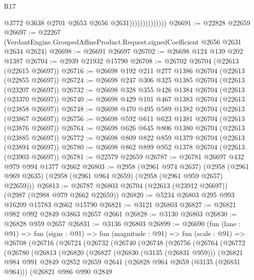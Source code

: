 \begin{lexlean}{R17}
\begin{coremodule}
                                @3772
                                @3638
                                @2701
                                @2653
                                @2656
                                @2631))))))))))))))
@26691 := @22828 @22659
@26697 := @22267
    (VerdantEngine.GroupedAffineProduct.Request.signedCoefficient @2656 @2631 @2634 @2624)
@26698 := @26691 @26697
@26702 := @26698 @124 @139 @202 @1387
@26704 := @2939 @21932 @15790
@26708 := @26702 @26704 (@22613 (@22615 @26697))
@26716 := @26698 @192 @211 @277 @1386 @26704 (@22613 (@22855 @26697))
@26724 := @26698 @247 @306 @325 @1385 @26704 (@22613 (@23207 @26697))
@26732 := @26698 @328 @355 @426 @1384 @26704 (@22613 (@23370 @26697))
@26740 := @26698 @429 @101 @467 @1383 @26704 (@22613 (@23858 @26697))
@26748 := @26698 @470 @495 @589 @1382 @26704 (@22613 (@23867 @26697))
@26756 := @26698 @592 @611 @623 @1381 @26704 (@22613 (@23876 @26697))
@26764 := @26698 @626 @645 @806 @1380 @26704 (@22613 (@23885 @26697))
@26772 := @26698 @809 @822 @859 @1379 @26704 (@22613 (@23894 @26697))
@26780 := @26698 @862 @899 @952 @1378 @26704 (@22613 (@23903 @26697))
@26781 := @22579 @22659
@26787 := @26781 @26697 @432 @979 @994 @1377 @2662
@26803 := @2958
    (@2961 @974 @2637)
    (@2958 (@2961 @969 @2635) (@2958 (@2961 @964 @2659) (@2958 (@2961 @959 @2657) @22659)))
@26813 := @26787 @26803 @26704 (@22613 (@23912 @26697)) (@2987 (@2988 @979 @2662 @22659))
@26820 := @5234 @26803 @295 @993 @16209 @15783 @2662 @15790
@26821 := @3121 @26803
@26827 := @26821 @982 @992 @2849 @3863 @2657 @2661
@26828 := @3130 @26803
@26830 := @26828 @959 @2657
@26831 := @3136 @26803
@26899 := @26690
    (fun (lane : @91) =>
    fun (signs : @91) =>
    fun (magnitude : @91) =>
    fun (scale : @91) =>
    @26708
      (@26716
        (@26724
          (@26732
            (@26740
              (@26748
                (@26756
                  (@26764
                    (@26772
                      (@26780
                        (@26813
                          (@26820
                            (@26827
                              (@26830 (@3135 (@26831 @959)))
                              (@26821
                                @984
                                @991
                                @2849
                                @2852
                                @2659
                                @2641
                                (@26828 @964 @2659 (@3135 (@26831 @964)))
                                (@26821
                                  @986
                                  @990
                                  @2849

\end{coremodule}
\end{lexlean}
